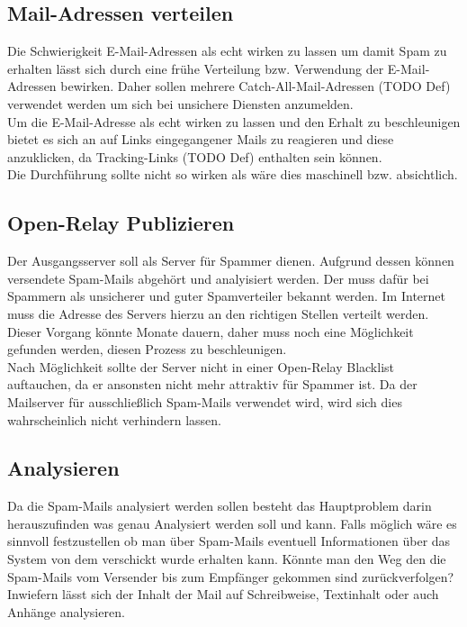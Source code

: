 \documentclass[a4paper,11pt,singlespacing]{article}
\begin{document}
	\subsection{Mail-Adressen verteilen}\label{sec:ProblemstellungMailsVerteilen}
		Die Schwierigkeit E-Mail-Adressen als echt wirken zu lassen um damit Spam zu erhalten lässt sich durch eine frühe Verteilung bzw. Verwendung der E-Mail-Adressen bewirken.
		Daher sollen mehrere Catch-All-Mail-Adressen (TODO Def) verwendet werden um sich bei unsichere Diensten anzumelden. %
		\\
		Um die E-Mail-Adresse als echt wirken zu lassen und den Erhalt zu beschleunigen bietet es sich an auf Links eingegangener Mails zu reagieren und diese anzuklicken, da Tracking-Links (TODO Def) enthalten sein können.
		\\
		Die Durchführung sollte nicht so wirken als wäre dies maschinell bzw. absichtlich.
	
	\subsection{Open-Relay Publizieren}\label{sec:ProblemstellungPublizieren}
		Der Ausgangsserver soll als  Server für Spammer dienen.
		Aufgrund dessen können versendete Spam-Mails abgehört und analyisiert werden.
		Der  muss dafür bei Spammern als unsicherer und guter Spamverteiler bekannt werden.
		Im Internet muss die Adresse des Servers hierzu an den richtigen Stellen verteilt werden.
		Dieser Vorgang könnte Monate dauern, daher muss noch eine Möglichkeit gefunden werden, diesen Prozess zu beschleunigen.
		\\
		Nach Möglichkeit sollte der Server nicht in einer Open-Relay Blacklist auftauchen, da er ansonsten nicht mehr attraktiv für Spammer ist. %
		Da der Mailserver für ausschließlich Spam-Mails verwendet wird, wird sich dies wahrscheinlich nicht verhindern lassen.

	\subsection{Analysieren}\label{sec:ProblemstellungAnalysieren}
		Da die Spam-Mails analysiert werden sollen besteht das Hauptproblem darin herauszufinden was genau Analysiert werden soll und kann.
		Falls möglich wäre es sinnvoll festzustellen ob man über Spam-Mails eventuell Informationen über das System von dem verschickt wurde erhalten kann.
		Könnte man den Weg den die Spam-Mails vom Versender bis zum Empfänger gekommen sind zurückverfolgen?
		Inwiefern lässt sich der Inhalt der Mail auf Schreibweise, Textinhalt oder auch Anhänge analysieren.
\end{document}
